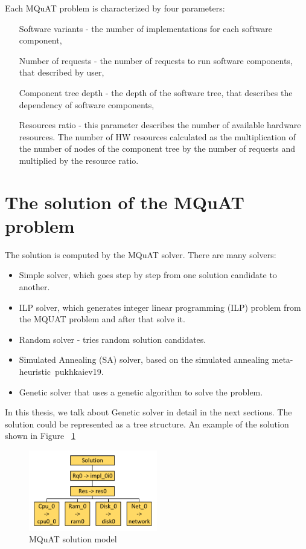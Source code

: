 Each MQuAT problem is characterized by four parameters:

\begin{itemize}
	\item[Software variants] - the number of implementations for each software component,
	\item[Number of requests] - the number of requests to run software components, that described by user, 
	\item[Component tree depth] - the depth of the software tree, that describes the dependency of software components,
	\item[Resources ratio] - this parameter describes the number of available hardware resources. The number of HW resources calculated as the multiplication of the number of nodes of the component tree by the number of requests and multiplied by the resource ratio.
\end{itemize}

\section{The solution of the MQuAT problem}

The solution is computed by the MQuAT solver. There are many solvers:

\begin{itemize}
	\item Simple solver, which goes step by step from one solution candidate to another.
	\item ILP solver, which generates integer linear programming (ILP) problem from the MQUAT problem and after that solve it.
	\item Random solver - tries random solution candidates.
	\item Simulated Annealing (SA) solver, based on the simulated annealing meta-heuristic~{pukhkaiev19}.
	\item Genetic solver that uses a genetic algorithm to solve the problem.
\end{itemize}

In this thesis, we talk about Genetic solver in detail in the next sections.
The solution could be represented as a tree structure. An example of the solution shown in Figure ~\ref{fig:SolutionModel}

\begin{figure}
	\centering
	\includegraphics[width=0.5\textwidth]{images/MQuATSolutionModel.pdf}
	\caption[MQuAT solution model]{MQuAT solution model}
	\label{fig:SolutionModel}
\end{figure}


